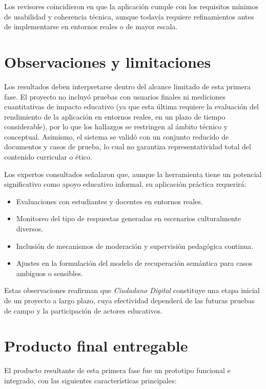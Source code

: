 Los revisores coincidieron en que la aplicación cumple con los requisitos
mínimos de usabilidad y coherencia técnica, aunque todavía requiere
refinamientos antes de implementarse en entornos reales o de mayor escala.

\section{Observaciones y limitaciones}
Los resultados deben interpretarse dentro del alcance limitado de esta primera
fase. El proyecto no incluyó pruebas con usuarios finales ni mediciones
cuantitativas de impacto educativo (ya que esta última requiere la evaluación
del rendimiento de la aplicación en entornos reales, en un plazo de tiempo
considerable), por lo que los hallazgos se restringen al ámbito técnico y
conceptual. Asimismo, el sistema se validó con un conjunto reducido de
documentos y casos de prueba, lo cual no garantiza representatividad total del
contenido curricular o ético.

Los expertos consultados señalaron que, aunque la herramienta tiene un
potencial significativo como apoyo educativo informal, su aplicación práctica
requerirá:

\begin{itemize}
      \item Evaluaciones con estudiantes y docentes en entornos reales.
      \item Monitoreo del tipo de respuestas generadas en escenarios culturalmente
            diversos.
      \item Inclusión de mecanismos de moderación y supervisión pedagógica continua.
      \item Ajustes en la formulación del modelo de recuperación semántica para casos
            ambiguos o sensibles.
\end{itemize}

Estas observaciones reafirman que \textit{Ciudadano Digital} constituye una etapa
inicial de un proyecto a largo plazo, cuya efectividad dependerá de las futuras
pruebas de campo y la participación de actores educativos.

\section{Producto final entregable}
El producto resultante de esta primera fase fue un prototipo funcional e
integrado, con las siguientes características principales:

